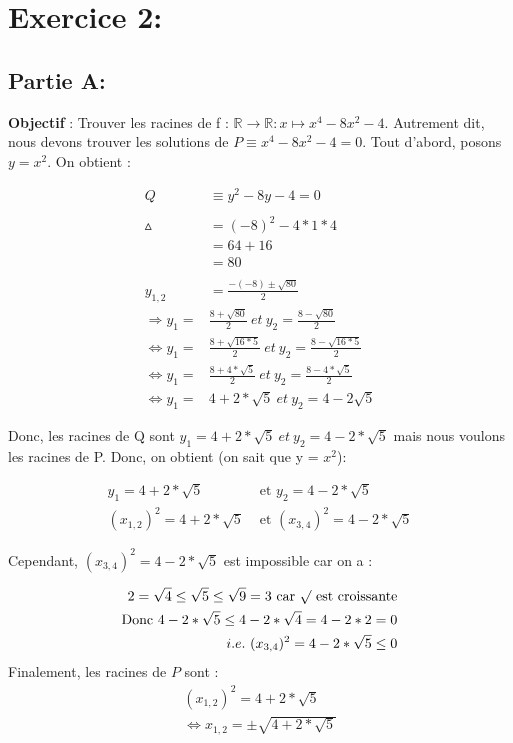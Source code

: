 \documentclass[a4paper, 12pt]{article}
\begin{document}
\newpage

\section{Exercice 2:}

\subsection{Partie A:}

\textbf{Objectif} : Trouver les racines de f : \( \mathbb{R} \rightarrow \mathbb{R} : x \mapsto x^4 - 8x^2 - 4 \).
Autrement dit, nous devons trouver les solutions de \( P \equiv x^4 - 8x^2 - 4 = 0 \). \newline
Tout d'abord, posons \( y = x^2 \).
On obtient :

\begin{align*}
	Q &\equiv y^2 - 8y - 4 = 0\\ \\
	\vartriangle &= (-8)^2 - 4 * 1 * 4 \\
	       &= 64 + 16 \\
	       &= 80 \\ \\
   y_{1,2} &= \frac{-(-8) \pm \sqrt{80}}{2} \\
   \Rightarrow y_1 = &\frac{8 + \sqrt{80}}{2} ~ et ~ y_2 = \frac{8 - \sqrt{80}}{2} \\
   \Leftrightarrow y_1 = &\frac{8 + \sqrt{16 * 5}}{2} ~ et ~ y_2 = \frac{8 - \sqrt{16 * 5}}{2} \\
   \Leftrightarrow y_1 = &\frac{8 + 4 * \sqrt{5}}{2} ~ et ~ y_2 = \frac{8 - 4 * \sqrt{5}}{2} \\
    \Leftrightarrow y_1 = &4 + 2 * \sqrt{5} ~ et ~ y_2 = 4 - 2\sqrt{5}
\end{align*}


Donc, les racines de Q sont \( y_1 = 4 + 2 * \sqrt{5} ~ et ~ y_2 = 4 - 2 * \sqrt{5}  \) mais nous voulons les racines de P. Donc, on obtient (on sait que y = $x^2$):


\begin{align*}
	y_1 = 4 + 2 * \sqrt{5}&\text{ et }y_2 = 4 - 2 * \sqrt{5} \\
	(x_{1,2})^2 = 4 + 2 * \sqrt{5}&\text{ et }(x_{3,4})^2 = 4 - 2 * \sqrt{5}
\end{align*}

	Cependant, $(x_{3,4})^2 = 4 - 2 * \sqrt{5}$ est impossible car on a :

\begin{align*}
	2 = \sqrt{4} \leq \sqrt{5} \leq \sqrt{9} = 3 \text{ car } \surd \text{ est croissante} \\
	\text{Donc } 4 - 2 * \sqrt{5} \leq 4 - 2 * \sqrt{4} = 4 - 2 * 2 = 0 \\
	i.e. ~ (x_{3,4})^2 = 4 - 2 * \sqrt{5} \leq 0
\end{align*}
Finalement, les racines de $P$ sont : \\
\begin{align*}
	(x_{1,2})^2 = 4 + 2 * \sqrt{5} \\
	\Leftrightarrow x_{1,2} = \pm \sqrt{4 + 2 * \sqrt{5}}
\end{align*}
\end{document}
